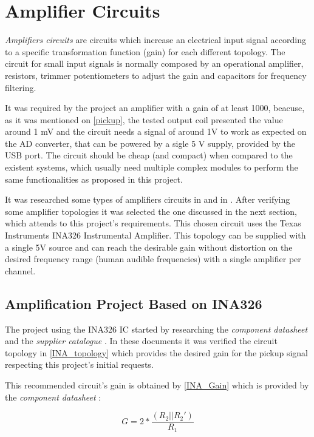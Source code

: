 \section{Amplifier Circuits}
\textit{Amplifiers circuits} \cite{amplifier-circuit} are circuits which increase
an electrical input signal according to a specific transformation function (gain)
for each different topology. The circuit for small input signals is normally
composed by an operational amplifier, resistors, trimmer potentiometers to adjust
the gain and capacitors for frequency filtering.

It was required by the project an amplifier with a gain of at least 1000, beacuse, as it was
mentioned on \autoref{pickup}, the tested output coil presented the value around 1 mV and the
circuit needs a signal of around 1V to work as expected on the AD converter, that can be powered by a sigle 5 V supply, provided by the USB port. The circuit
should be cheap (and compact) when compared to the existent systems, which usually need
multiple complex modules to perform the same functionalities as proposed in this project. 

It was researched some types of amplifiers circuits in 
and in . After verifying some amplifier topologies it was
selected the one discussed in the next section, which attends to this project's requirements.
This chosen circuit uses the Texas Instruments INA326 Instrumental Amplifier.
This topology
can be supplied with a single 5V source and can reach the desirable gain without
distortion on the desired frequency range (human audible frequencies) with a single
amplifier per channel.

\subsection{Amplification Project Based on INA326}
The project using the INA326 IC started by researching the \textit{component datasheet}
\cite{INA326} and the \textit{supplier catalogue} \cite{OpAmps}. In these documents
it was verified the circuit topology in \autoref{INA_topology} which provides the
desired gain for the pickup signal respecting this project's initial requests.

This recommended circuit's gain is obtained by \autoref{INA_Gain} which is
provided by the \textit{component datasheet} \cite{INA326}:

\begin{equation}
  \label{INA_Gain}
  G=2*\frac{(R_2||R_2 ')}{R_1}
\end{equation}


